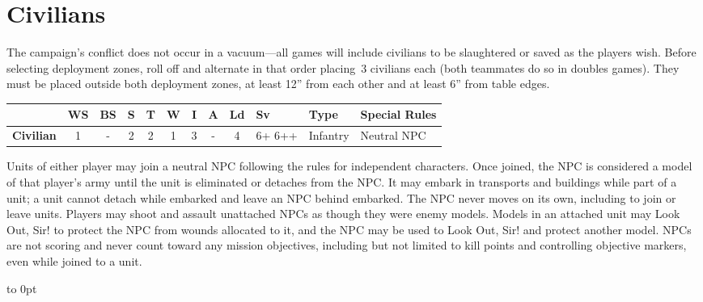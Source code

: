 \clearpage
\section{Civilians}

The campaign's conflict does not occur in a vacuum---all games will
include civilians to be slaughtered or saved as the players wish.
Before selecting deployment zones, roll off and alternate in that
order placing~3 civilians each (both teammates do so in doubles
games).  They must be placed outside both deployment zones, at least
12'' from each other and at least 6'' from table edges.

  \begin{center}    
  \begin{tabular}[t]{O{0.75in}ccccccccF{.25in}F{1in}E{2in}}
    & {\bf WS} &  {\bf BS} & {\bf S} & {\bf T} & {\bf W} & {\bf I} & {\bf A} & {\bf Ld} & {\bf Sv} & {\bf Type} & {\bf Special Rules}\\
\hline
    {\bf Civilian} & 1 & - & 2 & 2 & 1 & 3 & - & 4 & 6+ 6++ & Infantry & Neutral NPC\\
  \end{tabular}
  \end{center}

  \label{rule:neutral-npc}
  \hfill
  \begin{minipage}{6in}
     Units of either player may join a
    neutral NPC following the rules for independent characters.  Once
    joined, the NPC is considered a model of that player's army until
    the unit is eliminated or detaches from the NPC.  It may embark in
    transports and buildings while part of a unit; a unit cannot
    detach while embarked and leave an NPC behind embarked.  The NPC
    never moves on its own, including to join or leave units.  Players
    may shoot and assault unattached NPCs as though they were enemy
    models.  Models in an attached unit may Look Out, Sir! to protect
    the NPC from wounds allocated to it, and the NPC may be used to
    Look Out, Sir! and protect another model.  NPCs are not scoring
    and never count toward any mission objectives, including but not
    limited to kill points and controlling objective markers, even
    while joined to a unit.
  \end{minipage}
  \hfill\hbox to 0pt{}



